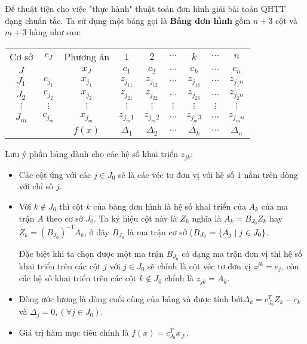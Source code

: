 Để thuật tiện cho việc "thực hành" thuật toán đơn hình giải bài toán QHTT dạng chuẩn tắc. Ta sử dụng một bảng gọi là {\bf Bảng đơn hình} gồm $n+3$ cột và $m+3$ hàng như sau:
\begin{center}
\begin{tabular}{|c|c|c|c|c|c|c|c|c|}
 \hline
Cơ sở&$c_J$&Phương án&$1$&$2$&$\cdots$&$k$ & $\cdots$ & $n$ \\ 
$J$&& $x_J$&  $c_1$& $c_2$& $\cdots$& $c_k$& $\cdots$ & $c_n$ \\ \hline
$J_1$     & $c_{j_1}$  & $x_{j_1}$   &  $z_{j_11}$  & $z_{j_12}$  & $\cdots$    & $z_{j_13}$  & $\cdots$ & $z_{j_1n}$\\
$J_2$     & $c_{j_2}$  & $x_{j_2}$   &  $z_{j_21}$  & $z_{j_22}$  & $\cdots$    & $z_{j_23}$  & $\cdots$ & $z_{j_2n}$\\
$\vdots$ & $\vdots$   & $\vdots$   &$\vdots$       & $\vdots$     &$\vdots$    &$\vdots$      & $\vdots$ & $\vdots$\\
$J_m$    & $c_{j_m}$ & $x_{j_m}$ &$z_{j_m1}$   & $z_{j_m2}$  & $\cdots$   & $z_{j_m3}$ & $\cdots$ & $z_{j_mn}$\\ \hline
              &                & $f(x)$       & $\Delta_1$   & $\Delta_2$  & $\cdots$   & $\Delta_k$  & $\cdots$ & $\Delta_n$ \\ \hline
\end{tabular}
\end{center}
Lưu ý phần bảng dành cho các hệ số khai triển $z_{jk}$:
\begin{itemize}
\item Các cột ứng với các $j\in J_0$ sẽ là các véc tơ đơn vị với hệ số $1$ nằm trên dòng với chỉ số $j$.
\item Với $k\notin J_0$ thì cột $k$ của bàng đơn hình là hệ số khai triển của $A_k$ của ma trận $A$ theo cơ sở $J_0$. Ta ký hiệu cột này là $Z_k$ nghĩa là $A_k = B_{J_0}Z_k$ hay $Z_k =(B_{J_0})^{-1}A_k$, ở đây $B_{J_0}$ là ma trận cơ sở ($B_{J_0}=\{A_j\;|\;j\in J_0\}$. 

Đặc biệt khi ta chọn được một ma trận $B_{J_0}$ có dạng ma trận đơn vị thì hệ số khai triển trên các cột $j$ với $j\in J_0$ sẽ chính là cột véc tơ đơn vị $z^{jk} = e_j$, còn các hệ số khai triển trên các cột $k\notin J_0$ chính là $z_{jk} = A_k$.
\item Dòng ước lượng là dòng cuối cùng của bảng và được tính bởi$\Delta_k = c^T_{J_0}Z_k -c_k$ và $\Delta_j=0, (\forall j\in J_0)$.
\item Giá trị hàm mục tiêu chính là $f(x) = c^T_{J_0}x_{J^)}$.
\end{itemize}

